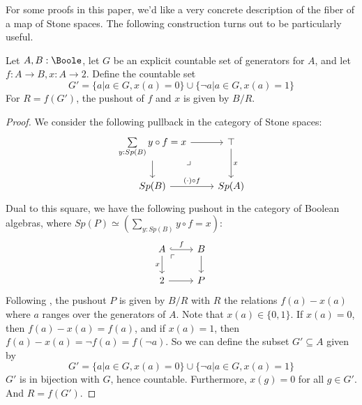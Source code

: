 For some proofs in this paper, 
we'd like a very concrete description of the fiber of a map of Stone spaces. 
The following construction turns out to be particularly useful. 
\begin{lemma}\label{FiberConstruction}
  Let $A,B:\Boole$, let $G$ be an explicit countable set of generators for $A$, and let 
  $f:A \to B, x:A\to 2$. 
  Define the countable set 
  \begin{equation}
    G' = \{a | a\in G, x(a) = 0\} \cup \{\neg a | a \in G, x(a) = 1\}
  \end{equation} 
  For $R = f(G')$,
  the pushout of $f$ and $x$ is given by $B/R$. 
\end{lemma}  
\begin{proof}
We consider the following pullback in the category of Stone spaces:
  \begin{equation}\begin{tikzcd}
    \sum\limits_{y:Sp(B)} y\circ f = x \arrow[d] \arrow[r] \arrow["\lrcorner"{pos=0.125}, phantom, dr] 
    & \top \arrow[d,"x"]\\
    Sp(B) \arrow[r,"(\cdot) \circ f"] & Sp(A)
  \end{tikzcd}  \end{equation}
Dual to this square, we have the following pushout in the category of Boolean algebras,
where $Sp(P) \simeq  (\sum\limits_{y:Sp(B)} y \circ f = x)$:
  \begin{equation}\begin{tikzcd}
    A \arrow[d,"x"'] \arrow[r,hook,"f"] \arrow[rd,phantom,"\ulcorner"{pos=0.125}] & B\arrow[d]\\
    2 \arrow[r] & P
  \end{tikzcd}\end{equation} 
  Following , 
  the pushout $P$ is given by $B/R$ with $R$ the relations $f(a) -x(a)$ 
  where $a$ ranges over the generators of $A$.
  Note that $x(a) \in \{0,1\}$. 
  If $x(a)=0$, then $f(a)-x(a) = f(a)$, 
  and if $x(a) = 1$, then $f(a) -x(a) = \neg f(a) = f(\neg a)$. 
  So we can define the subset $G'\subseteq A$ given by 
  \begin{equation}
    G' = \{a | a\in G, x(a) = 0\} \cup \{\neg a | a \in G, x(a) = 1\}
  \end{equation} 
  $G'$ is in bijection with $G$, hence countable. 
  Furthermore, $x(g) = 0$ for all $g\in G'$. 
  And $R = f(G')$.
\end{proof}





